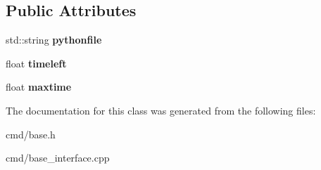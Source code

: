 \subsection*{Public Attributes}
\begin{DoxyCompactItemize}
\item 
std\+::string {\bfseries pythonfile}\hypertarget{classBaseInterface_1_1Room_1_1BasePython_afe7b05b5ec1c9210e4c511fe8c8a0f28}{}\label{classBaseInterface_1_1Room_1_1BasePython_afe7b05b5ec1c9210e4c511fe8c8a0f28}

\item 
float {\bfseries timeleft}\hypertarget{classBaseInterface_1_1Room_1_1BasePython_ad74b3ccd2fc05f74969ceab799f461de}{}\label{classBaseInterface_1_1Room_1_1BasePython_ad74b3ccd2fc05f74969ceab799f461de}

\item 
float {\bfseries maxtime}\hypertarget{classBaseInterface_1_1Room_1_1BasePython_a3c2c86285854d8ff63bc72ed10f78c98}{}\label{classBaseInterface_1_1Room_1_1BasePython_a3c2c86285854d8ff63bc72ed10f78c98}

\end{DoxyCompactItemize}


The documentation for this class was generated from the following files\+:\begin{DoxyCompactItemize}
\item 
cmd/base.\+h\item 
cmd/base\+\_\+interface.\+cpp\end{DoxyCompactItemize}
